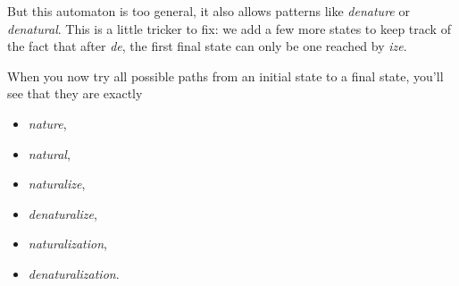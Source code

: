 \begin{examplebox}
    But this automaton is too general, it also allows patterns like \emph{denature} or \emph{denatural}.
    This is a little tricker to fix: we add a few more states to keep track of the fact that after \emph{de}, the first final state can only be one reached by \emph{ize}.
    \begin{center}
    \end{center}
    When you now try all possible paths from an initial state to a final state, you'll see that they are exactly
    \begin{itemize}
        \item \emph{nature},
        \item \emph{natural},
        \item \emph{naturalize},
        \item \emph{denaturalize},
        \item \emph{naturalization},
        \item \emph{denaturalization}.
    \end{itemize}
\end{examplebox}

